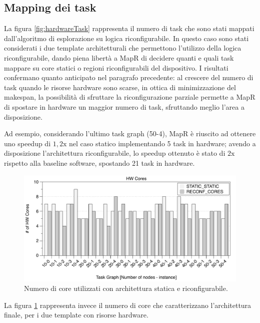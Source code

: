 \subsection{Mapping dei task}
La figura \ref{fig:hardwareTask} rappresenta il numero di task che sono stati mappati
dall'algoritmo di esplorazione su logica riconfigurabile.
In questo caso sono stati considerati i due template architetturali che permettono
l'utilizzo della logica riconfigurabile, dando piena libert\`a
a MapR di decidere quanti e quali task mappare su core statici o regioni riconfigurabili del dispositivo.
I risultati confermano quanto anticipato nel paragrafo precedente: al crescere del numero di
task quando le risorse hardware sono scarse, in ottica di minimizzazione del makespan, la possibilit\`a di sfruttare
la riconfigurazione parziale permette a MapR di spostare
in hardware un maggior numero di task, sfruttando meglio l'area a disposizione.

Ad esempio, considerando l'ultimo task graph (50-4), MapR \`e riuscito ad ottenere uno speedup di
$1,2\text{x}$ nel caso statico implementando 5 task in hardware; avendo a disposizione l'architettura
riconfigurabile, lo speedup ottenuto \`e stato di $2\text{x}$ rispetto alla baseline software,
spostando 21 task in hardware.

\begin{figure}[t]
 \begin{center}
  \includegraphics[width=\textwidth]{./capitoli/figure/cap6/FPL_HWcores.pdf}
  \caption{Numero di core utilizzati con architettura statica e riconfigurabile.}
  \label{fig:coreUtilizzati}
 \end{center}
\end{figure}

La figura \ref{fig:coreUtilizzati} rappresenta invece il numero di core che caratterizzano
l'architettura finale, per i due template con risorse hardware.

